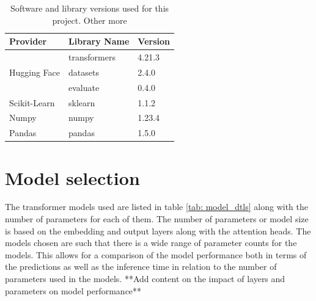 \begin{table}[ht]
    \captionsetup{font=small}
    \centering
    \begin{tabularx}{\textwidth}{|X|X|X|}
        \hline
        \rowcolor[gray]{0.7}
        \multirow{-3}{*}{} \textbf{Provider} & \textbf{Library Name} & \textbf{Version} \\
        \hline
        \multirow{3}{*}{Hugging Face}        & transformers          & 4.21.3           \\
        \cline{2-3}
                                             & datasets              & 2.4.0            \\
        \cline{2-3}
                                             & evaluate              & 0.4.0            \\
        \hline
        Scikit-Learn                         & sklearn               & 1.1.2            \\
        \hline
        Numpy                                & numpy                 & 1.23.4           \\
        \hline
        Pandas                               & pandas                & 1.5.0            \\
        \hline
    \end{tabularx}
    \caption{Software and library versions used for this project. Other more }
    \label{tab: libs_used}
\end{table}

\section{Model selection}




The transformer models used are listed in table \ref{tab: model_dtls} along with the number of parameters for each of them. The number of parameters or model size is based on the embedding and output layers along with the attention heads. The models chosen are such that there is a wide range of parameter counts for the models. This allows for a comparison of the model performance both in terms of the predictions as well as the inference time in relation to the number of parameters used in the models. **Add content on the impact of layers and parameters on model performance**

